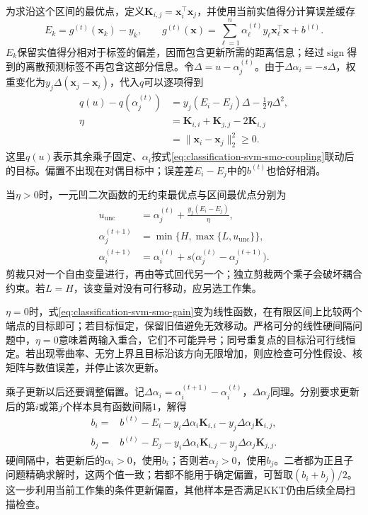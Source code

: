 为求沿这个区间的最优点，定义$\bm{K}_{i,j}=\bm{x}_i^{\top}\bm{x}_j$，并使用当前实值得分计算误差缓存
\[
  E_k=g^{(t)}(\bm{x}_k)-y_k,\qquad
  g^{(t)}(\bm{x})
  =\sum_{\ell=1}^n\alpha_\ell^{(t)}
     y_\ell\bm{x}_\ell^{\top}\bm{x}+b^{(t)}.
\]
$E_k$保留实值得分相对于标签的偏差，因而包含更新所需的距离信息；经过$\operatorname{sign}$得到的离散预测标签不再包含这部分信息。令$\Delta=u-\alpha_j^{(t)}$。由于$\Delta\alpha_i=-s\Delta$，权重变化为$y_j\Delta(\bm{x}_j-\bm{x}_i)$，代入$q$可以逐项得到
\begin{equation}
  \begin{aligned}
    q(u)-q(\alpha_j^{(t)})
      &=y_j(E_i-E_j)\Delta-\frac12\eta\Delta^2,\\
    \eta
      &=\bm{K}_{i,i}+\bm{K}_{j,j}-2\bm{K}_{i,j}\\
      &=\lVert\bm{x}_i-\bm{x}_j\rVert_2^2\ge0.
  \end{aligned}
  \label{eq:classification-svm-smo-gain}
\end{equation}
这里$q(u)$表示其余乘子固定、$\alpha_i$按式\eqref{eq:classification-svm-smo-coupling}联动后的目标。偏置不出现在对偶目标中；误差差$E_i-E_j$中的$b^{(t)}$也恰好相消。

当$\eta>0$时，一元凹二次函数的无约束最优点与区间最优点分别为
\begin{equation}
  \begin{aligned}
    u_{\mathrm{unc}}
      &=\alpha_j^{(t)}+\frac{y_j(E_i-E_j)}{\eta},\\
    \alpha_j^{(t+1)}
      &=\min\{H,\max\{L,u_{\mathrm{unc}}\}\},\\
    \alpha_i^{(t+1)}
      &=\alpha_i^{(t)}
        +s\bigl(\alpha_j^{(t)}-\alpha_j^{(t+1)}\bigr).
  \end{aligned}
  \label{eq:classification-svm-smo-update}
\end{equation}
剪裁只对一个自由变量进行，再由等式回代另一个；独立剪裁两个乘子会破坏耦合约束。若$L=H$，该变量对没有可行移动，应另选工作集。

$\eta=0$时，式\eqref{eq:classification-svm-smo-gain}变为线性函数，在有限区间上比较两个端点的目标即可；若目标恒定，保留旧值避免无效移动。严格可分的线性硬间隔问题中，$\eta=0$意味着两输入重合，它们不可能异号；同号重复点的目标沿可行线恒定。若出现零曲率、无穷上界且目标沿该方向无限增加，则应检查可分性假设、核矩阵与数值误差，并停止该次更新。

乘子更新以后还要调整偏置。记$\Delta\alpha_i=\alpha_i^{(t+1)}-\alpha_i^{(t)}$，$\Delta\alpha_j$同理。分别要求更新后的第$i$或第$j$个样本具有函数间隔$1$，解得
\begin{equation}
  \begin{aligned}
    b_i={}&b^{(t)}-E_i
       -y_i\Delta\alpha_i\bm{K}_{i,i}
       -y_j\Delta\alpha_j\bm{K}_{i,j},\\
    b_j={}&b^{(t)}-E_j
       -y_i\Delta\alpha_i\bm{K}_{i,j}
       -y_j\Delta\alpha_j\bm{K}_{j,j}.
  \end{aligned}
  \label{eq:classification-svm-smo-bias}
\end{equation}
硬间隔中，若更新后的$\alpha_i>0$，使用$b_i$；否则若$\alpha_j>0$，使用$b_j$。二者都为正且子问题精确求解时，这两个值一致；若都不能用于确定偏置，可暂取$(b_i+b_j)/2$。这一步利用当前工作集的条件更新偏置，其他样本是否满足KKT仍由后续全局扫描检查。

